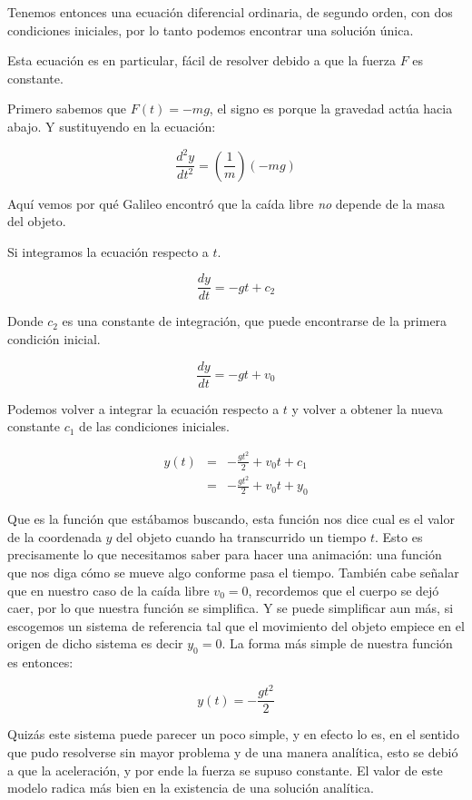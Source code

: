 Tenemos entonces una ecuación diferencial ordinaria, de segundo orden, con dos condiciones iniciales, por lo tanto podemos encontrar una solución única.

Esta ecuación es en particular, fácil de resolver debido a que la fuerza $F$ es constante.

Primero sabemos que $F(t) = -mg$, el signo es porque la gravedad actúa hacia abajo.
Y sustituyendo en la ecuación:

\begin{equation}
\label{fuerzaGravedad}
\frac{d^2y}{dt^2} = \left(\frac{1}{m}\right)\left( -mg \right) 
\end{equation}

Aquí vemos por qué Galileo encontró que la caída libre \emph{no} depende de la masa del objeto.

Si integramos la ecuación respecto a $t$.

$$ \frac{dy}{dt} = -gt + c_2 $$

Donde $c_2$ es una constante de integración, que puede encontrarse de la primera condición inicial.

$$ \frac{dy}{dt} = -gt + v_0 $$

Podemos volver a integrar la ecuación respecto a $t$ y volver a obtener la nueva constante $c_1$ de las condiciones iniciales.

\begin{eqnarray}
 y(t) & = & -\frac{gt^2}{2} + v_0t + c_1 \nonumber \\
      & = & -\frac{gt^2}{2} + v_0t + y_0
\end{eqnarray}

Que es la función que estábamos buscando, esta función nos dice cual es el valor de la coordenada $y$ del objeto cuando ha transcurrido un tiempo $t$.
Esto es precisamente lo que necesitamos saber para hacer una animación: una función que nos diga cómo se mueve algo conforme pasa el tiempo.
También cabe señalar que en nuestro caso de la caída libre $v_0 = 0$, recordemos que el cuerpo se dejó caer, por lo que nuestra función se simplifica.
Y se puede simplificar aun más, si escogemos un sistema de referencia tal que el movimiento del objeto empiece en el origen de dicho sistema es decir $y_0 = 0$.
La forma más simple de nuestra función es entonces:

\begin{equation}
 y(t) = -\frac{gt^2}{2}
\end{equation}

Quizás este sistema puede parecer un poco simple, y en efecto lo es, en el sentido que pudo resolverse sin mayor problema y de una manera analítica, esto se debió a que la aceleración, y por ende la fuerza se supuso constante.
El valor de este modelo radica más bien en la existencia de una solución analítica.


